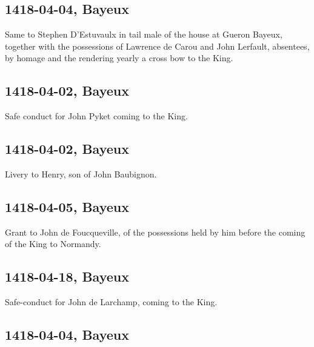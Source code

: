 \documentclass[a4paper,12pt,twoside]{book}
\begin{document}
                
                \subsection{1418-04-04, Bayeux}
                
                
                  Same to Stephen D’Estuvaulx in tail male of the house at Gueron Bayeux, together with the possessions of Lawrence de Carou and John Lerfault, absentees, by homage and the rendering yearly a cross bow to the King.
               
                
                \subsection{1418-04-02, Bayeux}
                
                
                  Safe conduct for John Pyket coming to the King.
               
                
                \subsection{1418-04-02, Bayeux}
                
                
                  Livery to Henry, son of John Baubignon.
               
                
                \subsection{1418-04-05, Bayeux}
                
                
                  Grant to John de Foucqueville, of the possessions held by him before the coming of the King to Normandy.
               
                
                \subsection{1418-04-18, Bayeux}
                
                
                  Safe-conduct for John de Larchamp, coming to the King.
               
                
                \subsection{1418-04-04, Bayeux}
                
\end{document}
